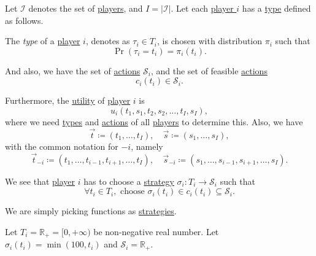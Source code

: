 \begin{definition}\label{def:mathematical-Bayesian-game}
	Let \(\mathcal{I} \) denotes the set of \hyperref[def:player]{players}, and \(I = \left\vert \mathcal{I}  \right\vert \). Let each \hyperref[def:player]{player \(i\)} has a \hyperref[def:type]{type} defined as follows.

	\begin{definition}[Type]\label{def:type}
		The \emph{type} of a \hyperref[def:player]{player} \(i\), denotes as \(\tau_{i}\in T_{i}\), is chosen with distribution
		\(\pi_i\) such that
		\[
			\Pr(\tau_{i} = t_{i}) = \pi_i(t_{i}) .
		\]
	\end{definition}

	And also, we have the set of \hyperref[def:strategy]{actions} \(\mathcal{S}_{i}\), and the set of feasible \hyperref[def:strategy]{actions}
	\[
		c_{i}(t_{i})\in \mathcal{S}_{i}.
	\]

	Furthermore, the \hyperref[def:reward]{utility} of \hyperref[def:player]{player} \(i\) is
	\[
		u_{i}(t_1, s_1, t_2, s_2, \dots , t_I, s_I),
	\]
	where we need \hyperref[def:type]{types} and \hyperref[def:strategy]{actions} of all \hyperref[def:player]{players} to determine this. Also, we have
	\[
		\vec{t}\coloneqq (t_1, \dots , t_I),\quad \vec{s} \coloneqq (s_1, \dots , s_I),
	\]
	with the common notation for \(-i\), namely
	\[
		\vec{t}_{-i} \coloneqq (t_1, \dots , t_{i-1}, t_{i+1}, \dots , t_{I}),\quad \vec{s}_{-i} \coloneqq (s_1, \dots , s_{i-1}, s_{i+1}, \dots , s_{I}).
	\]

	We see that \hyperref[def:player]{player} \(i\) has to choose a \hyperref[def:strategy]{strategy} \(\sigma_{i}\colon T_{i}\to \mathcal{S}_{i}\) such that
	\[
		\forall t_{i}\in T_{i}, \text{ choose }\sigma_{i}(t_{i})\in c_{i}(t_{i})\subseteq \mathcal{S}_{i}.
	\]
\end{definition}

\begin{intuition}
	We are simply picking functions as \hyperref[def:strategy]{strategies}.
\end{intuition}

\begin{eg}
	Let \(T_{i} = \mathbb{R}_+ = [0, +\infty )\) be non-negative real number. Let
	\(\sigma_{i}(t_{i}) = \min(100, t_{i})\) and \(\mathcal{S}_{i} = \mathbb{R}_+\).
	\begin{center}
	\end{center}
\end{eg}

